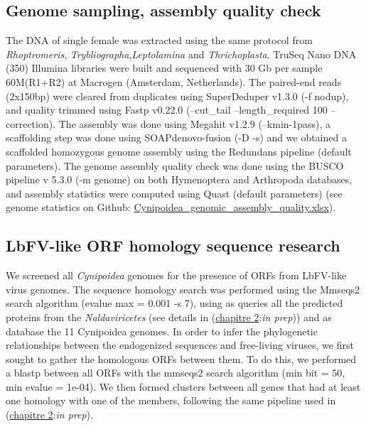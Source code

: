 \subsection{Genome sampling, assembly quality check}
The DNA of single female was extracted using the same protocol from \textit{Rhoptromeris}, \textit{Trybliographa},\textit{Leptolamina} and \textit{Thrichoplasta}. TruSeq Nano DNA (350) Illumina libraries were built and sequenced with 30 Gb per sample 60M(R1+R2) at Macrogen (Amsterdam, Netherlands). The paired-end reads (2x150bp) were cleared from duplicates using SuperDeduper v1.3.0 \citep{petersen_super_2015}  (-f nodup), and quality trimmed using Fastp v0.22.0 (--cut\_tail --length\_required 100 --correction). The assembly was done using Megahit v1.2.9 \citep{li_megahit_2015} (--kmin-1pass), a scaffolding step was done using SOAPdenovo-fusion (-D -s) and we obtained a scaffolded homozygous genome assembly using the Redundans pipeline \citep{pryszcz_redundans_2016} (default parameters). The genome assembly quality check was done using the BUSCO pipeline v 5.3.0  \citep{simao_busco_2015} (-m genome) on both Hymenoptera and Arthropoda databases, and assembly statistics were computed using Quast \citep{gurevich_quast_2013} (default parameters) (see genome statistics on Github: 
\href{https://github.com/BenjaminGuinet/PhD_defense/blob/main/Supplementary_paper3/Cynipoidea_genomic_assembly_quality.xlsx}{Cynipoidea\_genomic\_assembly\_quality.xlsx}).

\subsection{LbFV-like ORF homology sequence research}

We screened all \textit{Cynipoidea} genomes for the presence of ORFs from LbFV-like virus genomes. The sequence homology search was performed using the Mmseqs2 search algorithm \citep{steinegger_mmseqs2_2017} (evalue max = 0.001 -s 7), using as queries all the  predicted proteins from the \textit{Naldaviricetes}  (see details in (\hyperref[sec:chap2]{chapitre 2}:\textit{in prep})) and as database the 11 Cynipoidea genomes. In order to infer the phylogenetic relationships between the endogenized sequences and free-living viruses, we first sought to gather the homologous ORFs between them. To do this, we performed a blastp between all ORFs with the mmseqs2 search algorithm (min bit = 50, min evalue = 1e-04). We then formed clusters between all genes that had at least one homology with one of the members, following the same pipeline used in (\hyperref[sec:chap2]{chapitre 2}:\textit{in prep}). 

